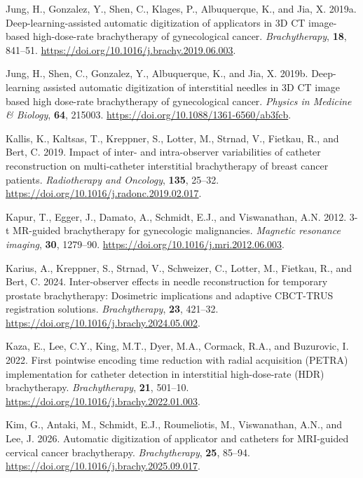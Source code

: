\documentclass[
  11pt,
]{article}
\newlength{\cslhangindent}
\newenvironment{CSLReferences}[2] %
 {\begin{list}{}{%
  \setlength{\itemindent}{0pt}
  \setlength{\leftmargin}{0pt}
  \setlength{\parsep}{0pt}
  \ifodd #1
   \setlength{\leftmargin}{\cslhangindent}
   \setlength{\itemindent}{-1\cslhangindent}
  \fi
  \setlength{\itemsep}{#2\baselineskip}}}
 {\end{list}}
\begin{document}
\begin{CSLReferences}{1}{1}
Jung, H., Gonzalez, Y., Shen, C., Klages, P., Albuquerque, K., and Jia,
X. 2019a. Deep-learning-assisted automatic digitization of applicators
in 3D CT image-based high-dose-rate brachytherapy of gynecological
cancer. \emph{Brachytherapy}, \textbf{18}, 841--51.
\url{https://doi.org/10.1016/j.brachy.2019.06.003}.

Jung, H., Shen, C., Gonzalez, Y., Albuquerque, K., and Jia, X. 2019b.
Deep-learning assisted automatic digitization of interstitial needles in
{3D} {CT} image based high dose-rate brachytherapy of gynecological
cancer. \emph{Physics in Medicine \& Biology}, \textbf{64}, 215003.
\url{https://doi.org/10.1088/1361-6560/ab3fcb}.

Kallis, K., Kaltsas, T., Kreppner, S., Lotter, M., Strnad, V., Fietkau,
R., and Bert, C. 2019. Impact of inter- and intra-observer variabilities
of catheter reconstruction on multi-catheter interstitial brachytherapy
of breast cancer patients. \emph{Radiotherapy and Oncology},
\textbf{135}, 25--32.
\url{https://doi.org/10.1016/j.radonc.2019.02.017}.

Kapur, T., Egger, J., Damato, A., Schmidt, E.J., and Viswanathan, A.N.
2012. 3-t MR-guided brachytherapy for gynecologic malignancies.
\emph{Magnetic resonance imaging}, \textbf{30}, 1279--90.
\url{https://doi.org/10.1016/j.mri.2012.06.003}.

Karius, A., Kreppner, S., Strnad, V., Schweizer, C., Lotter, M.,
Fietkau, R., and Bert, C. 2024. Inter-observer effects in needle
reconstruction for temporary prostate brachytherapy: Dosimetric
implications and adaptive {CBCT-TRUS} registration solutions.
\emph{Brachytherapy}, \textbf{23}, 421--32.
\url{https://doi.org/10.1016/j.brachy.2024.05.002}.

Kaza, E., Lee, C.Y., King, M.T., Dyer, M.A., Cormack, R.A., and
Buzurovic, I. 2022. First pointwise encoding time reduction with radial
acquisition (PETRA) implementation for catheter detection in
interstitial high-dose-rate (HDR) brachytherapy. \emph{Brachytherapy},
\textbf{21}, 501--10.
\url{https://doi.org/10.1016/j.brachy.2022.01.003}.

Kim, G., Antaki, M., Schmidt, E.J., Roumeliotis, M., Viswanathan, A.N.,
and Lee, J. 2026. Automatic digitization of applicator and catheters for
{MRI}-guided cervical cancer brachytherapy. \emph{Brachytherapy},
\textbf{25}, 85--94. \url{https://doi.org/10.1016/j.brachy.2025.09.017}.


\end{CSLReferences}
\end{document}
